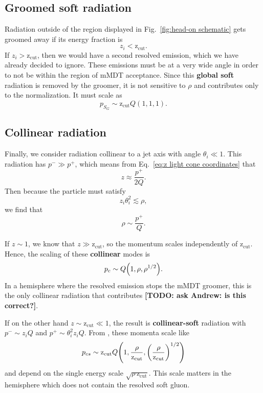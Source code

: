 \documentclass[12pt,twoside,class=../reedthesis, crop=false]{standalone}
\newcommand{\zcut}{\mathrm{z_{cut}}}
\begin{document}
\subsection{Groomed soft radiation}
	Radiation outside of the region displayed in Fig.~\ref{fig:head-on schematic} gets groomed away if its energy fraction is
	\begin{equation}
		z_i < \zcut.
	\end{equation}
	If $z_i > \zcut$, then we would have a second resolved emission, which we have already decided to ignore. These emissions must be at a very wide angle in order to not be within the region of mMDT acceptance. Since this \textbf{global soft} radiation is removed by the groomer, it is not sensitive to $\rho$ and contributes only to the normalization. It must scale as
	\begin{equation}
		p_{S_G} \sim \zcut Q(1, 1, 1).
	\end{equation}

\subsection{Collinear radiation}\label{sec:collinear radiation}
	Finally, we consider radiation collinear to a jet axis with angle $\theta_i \ll 1$. This radiation has $p^- \gg p^+$, which means from Eq.~\ref{eq:z light cone coordinates} that
	\begin{equation}
		z \approx \frac{p^+}{2Q}.
	\end{equation}
	Then because the particle must satisfy
	\begin{equation}
		z_i \theta_i^2 \lesssim \rho,
	\end{equation}
	we find that \cite{frye_factorization_2016}
	\begin{equation}
		\rho \sim \frac{p^+}{Q}.
	\end{equation}

	If $z \sim 1$, we know that $z \gg \zcut$, so the momentum scales independently of $\zcut$. Hence, the scaling of these \textbf{collinear} modes is \cite{frye_factorization_2016}
	\begin{equation}
		p_c \sim Q \qty(1, \rho, \rho^{1/2}).
	\end{equation}
	In a hemisphere where the resolved emission stops the mMDT groomer, this is the only collinear radiation that contributes {\color{red}\textbf{[TODO: ask Andrew: is this correct?]}}.

	If on the other hand $z \sim \zcut \ll 1$, the result is \textbf{collinear-soft} radiation with $p^- \sim z_i Q$ and $p^+ \sim \theta_i^2 z_i Q$. From \cite{frye_factorization_2016}, these momenta scale like
	\begin{equation}
		p_{cs} \sim \zcut Q \qty(1, \frac{\rho}{\zcut}, \qty(\frac{\rho}{\zcut})^{1/2})
	\end{equation}
	and depend on the single energy scale $\sqrt{\rho\,\zcut}$. This scale matters in the hemisphere which does not contain the resolved soft gluon.
\end{document}
